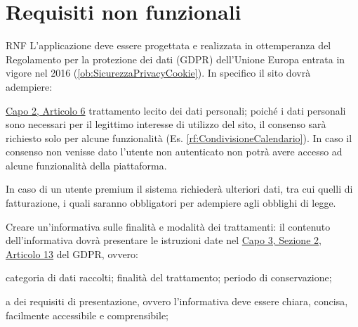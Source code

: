 \section{Requisiti non funzionali}
\label{secD1:RequisitiNonFunzionali}

\begin{listaPersonale}{RNF}
       L'applicazione deve essere progettata e realizzata in ottemperanza del Regolamento per la protezione dei dati (GDPR) dell'Unione Europa entrata in vigore nel 2016 (\ref{ob:SicurezzaPrivacyCookie}). In specifico il sito dovrà adempiere:
      \begin{listaPersonale2}[RNF]{}
             \href{https://eur-lex.europa.eu/legal-content/IT/TXT/?uri=uriserv:OJ.L_.2016.119.01.0001.01.ITA&toc=OJ:L:2016:119:TOC#d1e1898-1-1}{Capo 2, Articolo 6} trattamento lecito dei dati personali; poiché i dati personali sono necessari per il legittimo interesse di utilizzo del sito, il consenso sarà richiesto solo per alcune funzionalità (Es. \ref{rf:CondivisioneCalendario}). In caso il consenso non venisse dato l'utente non autenticato non potrà avere accesso ad alcune funzionalità della piattaforma.
            \begin{listaPersonale3}[RNF]{}
                   In caso di un utente premium il sistema richiederà ulteriori dati, tra cui quelli di fatturazione, i quali saranno obbligatori per adempiere agli obblighi di legge.
            \end{listaPersonale3}

             Creare un'informativa sulle finalità e modalità dei trattamenti: il contenuto dell'informativa dovrà presentare le istruzioni date nel \href{https://eur-lex.europa.eu/legal-content/IT/TXT/?uri=uriserv:OJ.L_.2016.119.01.0001.01.ITA&toc=OJ:L:2016:119:TOC#d1e2261-1-1}{Capo 3, Sezione 2, Articolo 13} del GDPR, ovvero:
            \begin{listaPersonale3}[RNF]{}
                   categoria di dati raccolti;
                   finalità del trattamento;
                   periodo di conservazione;
            \end{listaPersonale3}

             a dei requisiti di presentazione, ovvero l'informativa deve essere chiara, concisa, facilmente accessibile e comprensibile;


\end{listaPersonale2}
\end{listaPersonale}
